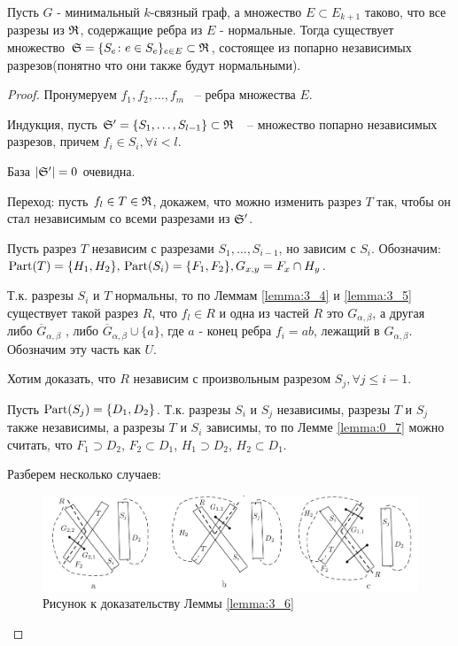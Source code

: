 \begin{customlm}{3.6} \label{lemma:3_6}
	Пусть $G$ - минимальный  $k$-связный граф, а множество  $E \subset E_{k+1}$ таково, что все разрезы из  $\R$, содержащие ребра из  $E$ - нормальные.
	Тогда существует множество  $\S = \{S_e \colon e \in S_e \}_{e \in E} \subset \R$, состоящее из попарно независимых разрезов(понятно что они также будут нормальными).
\end{customlm}

\begin{proof}
	Пронумеруем $f_1, f_2, \ldots, f_m$ ~-- ребра множества $E$.
	
	Индукция, пусть  $\S' = \{S_1, \ldots, S_{l - 1}\} \subset \R$ ~-- множество попарно независимых разрезов, причем $f_i \in S_i, \forall i < l$.

	База $|\S'| = 0$ очевидна.

	Переход: пусть $f_l \in T \in \R$, докажем, что можно изменить разрез  $T$ так, чтобы он стал независимым со всеми разрезами из  $\S'$.

	Пусть разрез  $T$ независим с разрезами  $S_1, \ldots, S_{i - 1}$, но зависим с $S_i$.
	Обозначим: $\Part(T) = \{H_1, H_2\}, \, \Part(S_i) = \{F_1, F_2\}, G_{x, y} = F_x \cap H_y$.

	Т.к. разрезы $S_i$ и  $T$ нормальны, то по Леммам \ref{lemma:3_4} и \ref{lemma:3_5} существует такой разрез  $R$, что  $f_l \in R$ и одна из частей  $R$ это  $G_{\alpha, \beta}$, а другая  либо  $\overline G_{\alpha, \beta}$ , либо  $\overline G_{\alpha, \beta} \cup \{a\}$, где $a$ - конец ребра  $f_i = ab$, лежащий в  $G_{\alpha, \beta}$.
	Обозначим эту часть как $U$.

	Хотим доказать, что $R$ независим с произвольным разрезом  $S_j, \forall j \leqslant i - 1$.

	Пусть $\Part(S_j) = \{D_1, D_2\}$. 
	Т.к. разрезы $S_i$ и  $S_j$ независимы, разрезы  $T$ и  $S_j$ также независимы, а разрезы  $T$ и  $S_i$ зависимы, то по Лемме \ref{lemma:0_7} можно считать, что $F_1 \supset D_2$, $F_2 \subset D_1$, $H_1 \supset D_2$, $H_2 \subset D_1$.

	Разберем несколько случаев:

\begin{figure}[ht]
    \centering
	\label{fig:3_lemma_6}
	\includegraphics[width=0.7\columnwidth]{figures/3_lemma_6.png}
	\caption{Рисунок к доказательству Леммы \ref{lemma:3_6}}
\end{figure}


\end{proof}

